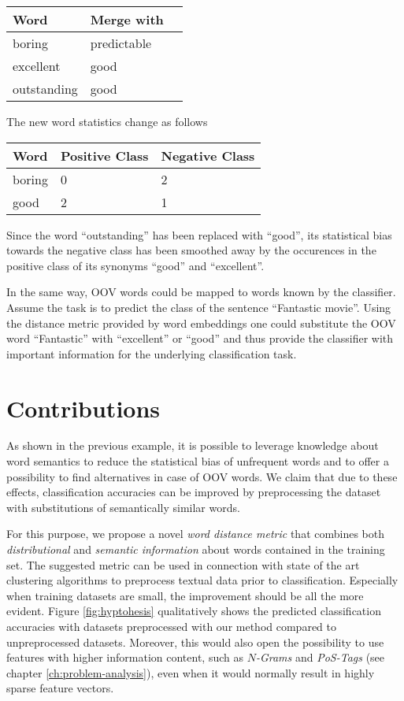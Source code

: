 \begin{center}
\begin{tabular}{l|l|l}
\textbf{Word} & \textbf{Merge with}  \\
\hline
boring & predictable \\
excellent & good \\
outstanding & good \\
\end{tabular}
\end{center}

The new word statistics change as follows

\begin{center}
\begin{tabular}{l|l|l}
\textbf{Word} & \textbf{Positive Class} & \textbf{Negative Class}  \\
\hline
boring & 0 & 2 \\
good & 2 & 1 \\
\end{tabular}
\end{center}

Since the word ``outstanding'' has been replaced with ``good'', its
statistical bias towards the negative class has been smoothed away by the
occurences in the positive class of its synonyms ``good'' and ``excellent''.
 
In the same way, OOV words could be mapped to words known by the
classifier. Assume the task is to predict the class of the sentence ``Fantastic movie''. 
Using the distance metric provided by word embeddings one could substitute the
OOV word ``Fantastic'' with ``excellent'' or ``good'' and thus provide the
classifier with important information for the underlying classification task.

\section{Contributions}

As shown in the previous example, it is possible to leverage knowledge
about word semantics to reduce the statistical bias of unfrequent words and to
offer a possibility to find alternatives in case of OOV words.
We claim that due to these effects, classification accuracies can be
improved by preprocessing the dataset with substitutions of semantically similar words.

For this purpose, we propose a novel \emph{word distance metric} that combines
both \emph{distributional} and \emph{semantic information} about words contained
in the training set. The suggested metric can be used in connection with state
of the art clustering algorithms to preprocess textual data prior to classification.
Especially when training datasets are small, the improvement should be all the more
evident. Figure \ref{fig:hyptohesis} qualitatively shows the predicted
classification accuracies with datasets preprocessed with our method compared
to unpreprocessed datasets. Moreover, this would also open the possibility to use features with higher
information content, such as \emph{$N$-Grams} and \emph{PoS-Tags} (see chapter
\ref{ch:problem-analysis}), even when it would normally result in highly sparse
feature vectors.

